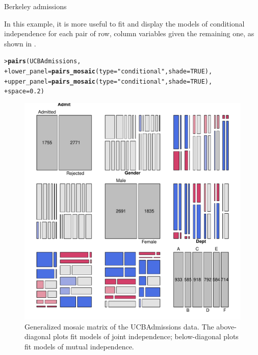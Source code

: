 \documentclass[10pt,krantz2]{krantz}\usepackage[]{graphicx}\usepackage[]{color}
\makeatletter
\newcommand{\hlnum}[1]{\textcolor[rgb]{0.686,0.059,0.569}{#1}}%
\newcommand{\hlstr}[1]{\textcolor[rgb]{0.192,0.494,0.8}{#1}}%
\newcommand{\hlstd}[1]{\textcolor[rgb]{0.345,0.345,0.345}{#1}}%
\newcommand{\hlkwc}[1]{\textcolor[rgb]{0.333,0.667,0.333}{#1}}%
\newcommand{\hlkwd}[1]{\textcolor[rgb]{0.737,0.353,0.396}{\textbf{#1}}}%
\newenvironment{kframe}{%
 \def\at@end@of@kframe{}%
 \ifinner\ifhmode%
  \def\at@end@of@kframe{\end{minipage}}%
  \begin{minipage}{\columnwidth}%
 \fi\fi%
 \def\FrameCommand##1{\hskip\@totalleftmargin \hskip-\fboxsep
 \colorbox{shadecolor}{##1}\hskip-\fboxsep
     \hskip-\linewidth \hskip-\@totalleftmargin \hskip\columnwidth}%
 \MakeFramed {\advance\hsize-\width
   \@totalleftmargin\z@ \linewidth\hsize
   \@setminipage}}%
 {\par\unskip\endMakeFramed%
 \at@end@of@kframe}
\newenvironment{knitrout}{}{} %
\renewenvironment{knitrout}{\small\renewcommand{\baselinestretch}{.85}}{} %
\makeatother
\begin{document}
\begin{Example}[berkeley4b]{Berkeley admissions}
\begin{knitrout}
\end{knitrout}

In this example, it is more useful to fit and display the models of conditional independence
for each pair of row, column variables given the remaining one, as shown in .
\begin{knitrout}
\color{fgcolor}\begin{kframe}
\begin{alltt}
\hlstd{> }\hlkwd{pairs}\hlstd{(UCBAdmissions,}
\hlstd{+ }      \hlkwc{lower_panel} \hlstd{=} \hlkwd{pairs_mosaic}\hlstd{(}\hlkwc{type} \hlstd{=} \hlstr{"conditional"}\hlstd{,} \hlkwc{shade} \hlstd{=} \hlnum{TRUE}\hlstd{),}
\hlstd{+ }      \hlkwc{upper_panel} \hlstd{=} \hlkwd{pairs_mosaic}\hlstd{(}\hlkwc{type} \hlstd{=} \hlstr{"conditional"}\hlstd{,} \hlkwc{shade} \hlstd{=} \hlnum{TRUE}\hlstd{),}
\hlstd{+ }      \hlkwc{space} \hlstd{=} \hlnum{0.2}\hlstd{)}
\end{alltt}
\end{kframe}\begin{figure}[!htb]

\centerline{\includegraphics[width=.8\textwidth]{ch05/fig/berk-pairs3-1} }

\caption[Generalized mosaic matrix of the UCBAdmissions data]{Generalized mosaic matrix of the UCBAdmissions data. The above-diagonal plots fit models of joint independence; below-diagonal plots fit models of mutual independence.\label{fig:berk-pairs3}}
\end{figure}



\end{knitrout}
\end{Example}
\end{document}
